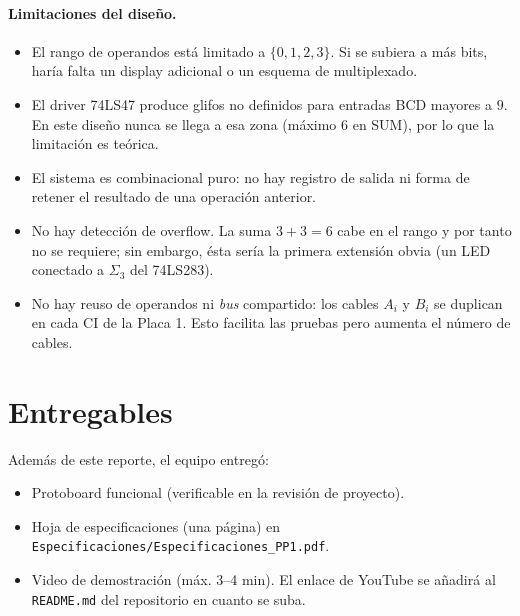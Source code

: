 \documentclass[a4paper,12pt]{article}
\begin{document}
\paragraph{Limitaciones del dise\~{n}o.}
\begin{itemize}[leftmargin=*, itemsep=2pt]
  \item El rango de operandos est\'{a} limitado a $\{0,1,2,3\}$. Si se
        subiera a m\'{a}s bits, har\'{i}a falta un display adicional o
        un esquema de multiplexado.
  \item El driver 74LS47 produce glifos no definidos para entradas BCD
        mayores a $9$. En este dise\~{n}o nunca se llega a esa zona
        (m\'{a}ximo $6$ en SUM), por lo que la limitaci\'{o}n es te\'{o}rica.
  \item El sistema es combinacional puro: no hay registro de salida ni
        forma de retener el resultado de una operaci\'{o}n anterior.
  \item No hay detecci\'{o}n de overflow. La suma $3+3 = 6$ cabe en
        el rango y por tanto no se requiere; sin embargo, \'{e}sta ser\'{i}a
        la primera extensi\'{o}n obvia (un LED conectado a $\Sigma_3$
        del 74LS283).
  \item No hay reuso de operandos ni \textit{bus} compartido: los cables
        $A_i$ y $B_i$ se duplican en cada CI de la Placa 1. Esto
        facilita las pruebas pero aumenta el n\'{u}mero de cables.
\end{itemize}

\section*{Entregables}
Adem\'{a}s de este reporte, el equipo entreg\'{o}:
\begin{itemize}[leftmargin=*]
  \item Protoboard funcional (verificable en la revisi\'{o}n de
        proyecto).
  \item Hoja de especificaciones (una p\'{a}gina) en
        \mbox{\texttt{Especificaciones/Especificaciones\_PP1.pdf}}.
  \item Video de demostraci\'{o}n (m\'{a}x. 3--4 min). El enlace de
        YouTube se a\~{n}adir\'{a} al \texttt{README.md} del repositorio
        en cuanto se suba.
\end{itemize}
\end{document}
